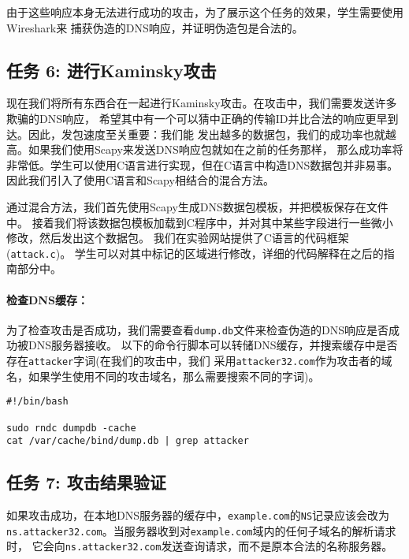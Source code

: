 由于这些响应本身无法进行成功的攻击，为了展示这个任务的效果，学生需要使用Wireshark来
捕获伪造的DNS响应，并证明伪造包是合法的。



\subsection{任务 6: 进行Kaminsky攻击}   

现在我们将所有东西合在一起进行Kaminsky攻击。在攻击中，我们需要发送许多欺骗的DNS响应，
希望其中有一个可以猜中正确的传输ID并比合法的响应更早到达。因此，发包速度至关重要：我们能
发出越多的数据包，我们的成功率也就越高。如果我们使用Scapy来发送DNS响应包就如在之前的任务那样，
那么成功率将非常低。学生可以使用C语言进行实现，但在C语言中构造DNS数据包并非易事。
因此我们引入了使用C语言和Scapy相结合的混合方法。


通过混合方法，我们首先使用Scapy生成DNS数据包模板，并把模板保存在文件中。
接着我们将该数据包模板加载到C程序中，并对其中某些字段进行一些微小修改，然后发出这个数据包。
我们在实验网站提供了C语言的代码框架 (\texttt{attack.c})。
学生可以对其中标记的区域进行修改，详细的代码解释在之后的指南部分中。



\paragraph{检查DNS缓存：}
为了检查攻击是否成功，我们需要查看{\tt dump.db}文件来检查伪造的DNS响应是否成功被DNS服务器接收。
以下的命令行脚本可以转储DNS缓存，并搜索缓存中是否存在\texttt{attacker}字词(在我们的攻击中，我们
采用\texttt{attacker32.com}作为攻击者的域名，如果学生使用不同的攻击域名，那么需要搜索不同的字词)。
 

\begin{lstlisting}
#!/bin/bash

sudo rndc dumpdb -cache
cat /var/cache/bind/dump.db | grep attacker
\end{lstlisting}
 

\subsection{任务 7: 攻击结果验证}

如果攻击成功，在本地DNS服务器的缓存中，\texttt{example.com}的{\tt NS}记录应该会改为
\texttt{ns.attacker32.com}。当服务器收到对\texttt{example.com}域内的任何子域名的解析请求时，
它会向\texttt{ns.attacker32.com}发送查询请求，而不是原本合法的名称服务器。



